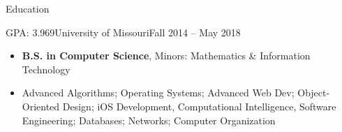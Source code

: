 \documentclass[]{mcdowellcv}
\begin{document}
    \makeheader

    \begin{cvsection}{Education}
        \begin{cvsubsection}{GPA: 3.969}{University of Missouri}{Fall 2014 -- May 2018}
            \begin{itemize}
                \item \textbf{B.S. in Computer Science}, Minors: Mathematics \& Information Technology
                \item Advanced Algorithms; Operating Systems; Advanced Web Dev; Object-Oriented Design;
                        iOS Development, Computational Intelligence, Software Engineering;
                        Databases; Networks; Computer Organization
            \end{itemize}
        \end{cvsubsection}
    \end{cvsection}
    
\end{document}

